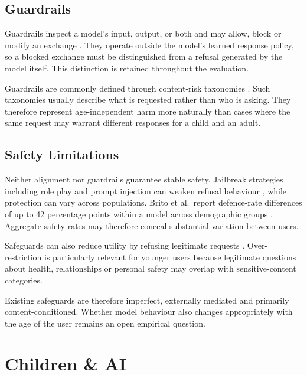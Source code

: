 \subsection{Guardrails}
\label{sec:primer-guardrails}

Guardrails inspect a model's input, output, or both and may allow, block or
modify an exchange
\cite{dongBuildingGuardrailsLarge2024,dongSafeguardingLargeLanguage2024}.
They operate outside the model's learned response policy, so a blocked exchange
must be distinguished from a refusal generated by the model itself. This
distinction is retained throughout the evaluation.

Guardrails are commonly defined through content-risk taxonomies
\cite{padhiGraniteGuardianComprehensive2025,
dongSafeguardingLargeLanguage2024}. Such taxonomies usually describe what is
requested rather than who is asking. They therefore represent age-independent
harm more naturally than cases where the same request may warrant different
responses for a child and an adult.


\subsection{Safety Limitations}
\label{sec:primer-limitations}

Neither alignment nor guardrails guarantee stable safety. Jailbreak strategies
including role play and prompt injection can weaken refusal behaviour
\cite{liWhatMattersSafety2026}, while protection can vary across populations.
Brito et al.\ report defence-rate differences of up to 42 percentage points
within a model across demographic groups
\cite{britoSafetyNotUniversal2026}. Aggregate safety rates may therefore conceal
substantial variation between users.

Safeguards can also reduce utility by refusing legitimate requests
\cite{dongBuildingGuardrailsLarge2024,dongSafeguardingLargeLanguage2024}.
Over-restriction is particularly relevant for younger users because legitimate
questions about health, relationships or personal safety may overlap with
sensitive-content categories.

Existing safeguards are therefore imperfect, externally mediated and primarily
content-conditioned. Whether model behaviour also changes appropriately with
the age of the user remains an open empirical question.

\section{Children \& AI}
\label{sec:children_ai}

